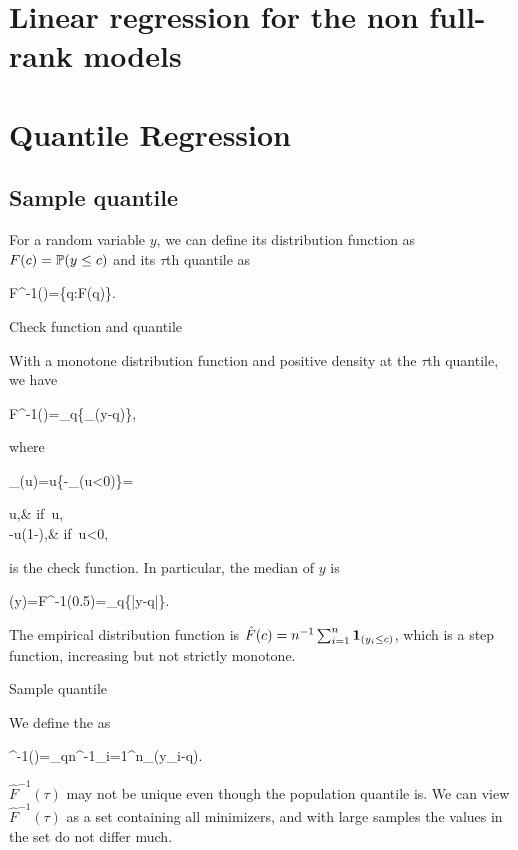 \documentclass[10pt,a4paper]{book}
\begin{document}
\section{Linear regression for the non full-rank models}\label{sec:LR_nonfull_rank}

\section{Quantile Regression}\label{sec:qt_reg}
\subsection{Sample quantile}\label{sec:sample_qt}
For a random variable $y$, we can define its distribution function as $F(c)=\mathbb P(y\leq c)$ and its $\tau$th quantile as 
\begin{sequation*}
	F^{-1}(\tau)=\inf\{q:F(q)\geq \tau\}.
\end{sequation*}  
\begin{thmbox}{Check function and quantile}
	\begin{proposition}\label{prop:check_function_qt}
		With a monotone distribution function and positive density at the $\tau$th quantile, we have  
		\begin{sequation}\label{eq:qt}
			F^{-1}(\tau)=\arg\min_{q\in\bbR}\bbE\left\{\rho_{\tau}(y-q)\right\},
		\end{sequation}
		where 
		\begin{sequation*}
			\rho_\tau(u)=u\left\{\tau-\1_{(u<0)}\right\}=\begin{cases}
				u\tau,& if\ u,\\
				-u(1-\tau),& if\ u<0,
			\end{cases}
		\end{sequation*}
		is the check function. In particular, the median of $y$ is  
		\begin{sequation*}
			(y)=F^{-1}(0.5)=_{q\in{}}\bbE\left\{|y-q|\right\}.
		\end{sequation*}
	\end{proposition}
\end{thmbox}

The empirical distribution function is $\hat{F}(c)=n^{-1}\sum_{i=1}^{n}{\boldsymbol 1}_{(y_i\leq c)}$, which is a step function,
increasing but not strictly monotone.
\begin{defbox}{Sample quantile}
	\begin{definition}\label{def:sample_qt}
		We define the  as 
		\begin{sequation}\label{eq:sample_qt}
			^{-1}(\tau)=\arg\min_{q\in{}}n^{-1}\sum_{i=1}^n\rho_\tau(y_i-q).
		\end{sequation}
	\end{definition}
\end{defbox}
$\hat{F}^{-1}(\tau)$ may not be unique even though the population quantile is. We can view $\hat{F}^{-1}(\tau)$ as a set containing all minimizers, and with large samples the values in the set do not differ much.
\end{document}
